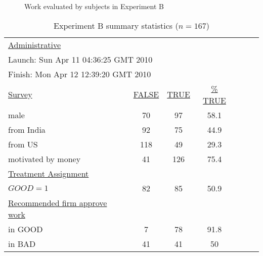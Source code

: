 \documentclass[12pt]{article}
\begin{document}
\begin{figure}
  \centering 
  \caption{Work evaluated by subjects in Experiment B \label{fig:work.samples2}}
\end{figure} 

\begin{table}[h!]
 \begin{center} 
   \caption{Experiment B summary statistics ($n=167$) \label{tab:ExpB.ss}}
\begin{tabular}{lcccccc}
  \toprule 
  \underline{Administrative} \\
    \multicolumn{4}{l}{\hspace{10pt} Launch:  Sun Apr 11 04:36:25 GMT 2010} \\
    \multicolumn{4}{l}{\hspace{10pt} Finish:  Mon Apr 12 12:39:20 GMT 2010} \\[5pt]
  \underline{Survey}    & \underline{FALSE} & \underline{TRUE} & \underline{\% TRUE}   \\
  \hspace{10pt} male                  & 70 & 97 & 58.1  \\
  \hspace{10pt} from India                 & 92 & 75 & 44.9  \\
  \hspace{10pt} from US                    & 118 & 49 & 29.3  \\
  \hspace{10pt} motivated by money                 & 41 & 126 & 75.4  \\[5pt]
  \underline{Treatment Assignment} \\ 
  \hspace{10pt} $GOOD=1$                & 82 & 85 & 50.9  \\[5pt]
 
 \underline{Recommended firm approve work}   \\
  \hspace{10pt} in GOOD           & 7 & 78 & 91.8\\
  \hspace{10pt} in BAD           & 41 & 41 & 50\\[5pt]
  

\end{tabular}
\end{center}
\end{table}
\end{document}
